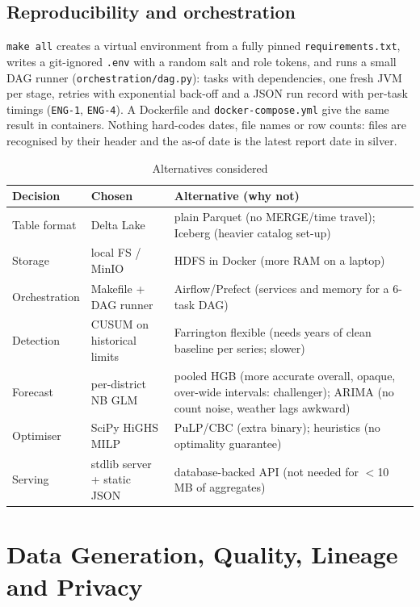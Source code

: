 \documentclass[conference]{IEEEtran}
\newcommand{\req}[1]{\texttt{#1}}
\begin{document}
\subsection{Reproducibility and orchestration}
\texttt{make all} creates a virtual environment from a fully pinned \texttt{requirements.txt}, writes a
git-ignored \texttt{.env} with a random salt and role tokens, and runs a small DAG runner
(\texttt{orchestration/dag.py}): tasks with dependencies, one fresh JVM per stage, retries with exponential
back-off and a JSON run record with per-task timings (\req{ENG-1}, \req{ENG-4}). A Dockerfile and
\texttt{docker-compose.yml} give the same result in containers. Nothing hard-codes dates, file names or row
counts: files are recognised by their header and the as-of date is the latest report date in silver.

\begin{table}[t]\centering\footnotesize
\caption{Alternatives considered}\label{tab:alt}
\begin{tabular}{@{}p{1.5cm}p{2.2cm}p{4.0cm}@{}}\toprule
Decision & Chosen & Alternative (why not)\\\midrule
Table format & Delta Lake & plain Parquet (no MERGE/time travel); Iceberg (heavier catalog set-up)\\
Storage & local FS / MinIO & HDFS in Docker (more RAM on a laptop)\\
Orchestration & Makefile + DAG runner & Airflow/Prefect (services and memory for a 6-task DAG)\\
Detection & CUSUM on historical limits & Farrington flexible (needs years of clean baseline per series; slower)\\
Forecast & per-district NB GLM & pooled HGB (more accurate overall, opaque, over-wide intervals: challenger); ARIMA (no count noise, weather lags awkward)\\
Optimiser & SciPy HiGHS MILP & PuLP/CBC (extra binary); heuristics (no optimality guarantee)\\
Serving & stdlib server + static JSON & database-backed API (not needed for $<$10\,MB of aggregates)\\\bottomrule
\end{tabular}\end{table}

\section{Data Generation, Quality, Lineage and Privacy}\label{sec:data}
\end{document}

